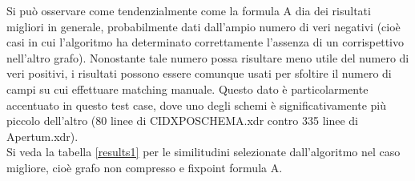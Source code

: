 \documentclass[a4paper,10pt]{article}
\begin{document}
\begin{center}
\end{center}

Si può osservare come tendenzialmente come la formula A dia dei risultati migliori in generale, probabilmente dati dall'ampio numero di veri negativi (cioè casi in cui l'algoritmo ha determinato correttamente l'assenza di un corrispettivo nell'altro grafo). Nonostante tale numero possa risultare meno utile del numero di veri positivi, i risultati possono essere comunque usati per sfoltire il numero di campi su cui effettuare matching manuale. Questo dato è particolarmente accentuato in questo test case, dove uno degli schemi è significativamente più piccolo dell'altro (80 linee di CIDXPOSCHEMA.xdr contro 335 linee di Apertum.xdr).\\

Si veda la tabella \ref{results1} per le similitudini selezionate dall’algoritmo nel caso migliore, cioè grafo non compresso e fixpoint formula A.
\end{document}
